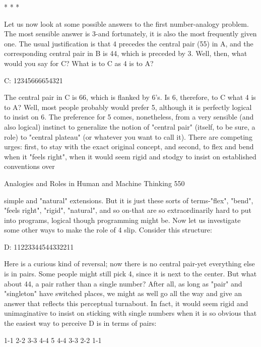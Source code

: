                                            *   *   *

       Let us now look at some possible answers to the first number-analogy
problem. The most sensible answer is 3-and fortunately, it is also the most frequently
given one. The usual justification is that 4 precedes the central pair (55) in A, and the
corresponding central pair in B is 44, which is preceded by 3. Well, then, what would
you say for C? What is to C as 4 is to A?

                C:   12345666654321

        The central pair in C is 66, which is flanked by 6's. Is 6, therefore, to C what 4
is to A? Well, most people probably would prefer 5, although it is perfectly logical to
insist on 6. The preference for 5 comes, nonetheless, from a very sensible (and also
logical) instinct to generalize the notion of "central pair" (itself, to be sure, a role) to
"central plateau" (or whatever you want to call it). There are competing urges: first, to
stay with the exact original concept, and second, to flex and bend when it "feels
right", when it would seem rigid and stodgy to insist on established conventions over




Analogies and Roles in Human and Machine Thinking                                          550

simple and "natural" extensions. But it is just these sorts of terms-"flex", "bend",
"feels right", "rigid", "natural", and so on-that are so extraordinarily hard to put into
programs, logical though programming might be.
        Now let us investigate some other ways to make the role of 4 slip. Consider
this structure:

               D:    11223344544332211

         Here is a curious kind of reversal; now there is no central pair-yet everything
else is in pairs. Some people might still pick 4, since it is next to the center. But what
about 44, a pair rather than a single number? After all, as long as "pair" and
"singleton" have switched places, we might as well go all the way and give an answer
that reflects this perceptual turnabout. In fact, it would seem rigid and unimaginative
to insist on sticking with single numbers when it is so obvious that the easiest way to
perceive D is in terms of pairs:

               1-1 2-2 3-3 4-4 5 4-4 3-3 2-2 1-1

